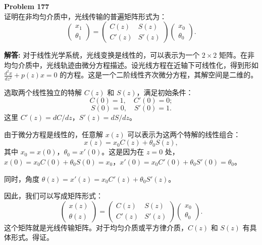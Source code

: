 \documentclass[12pt, a4paper, oneside]{ctexart}
\newenvironment{solution}{\par\noindent\textbf{解答:}\quad}{\par}
\begin{document}
\begin{mdframed}[backgroundcolor=gray!10, linewidth=0pt]
    \textbf{Problem 177} \\
    证明在非均匀介质中，光线传输的普遍矩阵形式为：
    \[
    \begin{pmatrix} x_1 \\ \theta_1 \end{pmatrix} = \begin{pmatrix} C(z) & S(z) \\ C'(z) & S'(z) \end{pmatrix} \begin{pmatrix} x_0 \\ \theta_0 \end{pmatrix}.
    \]
\end{mdframed}
\begin{solution}
    对于线性光学系统，光线变换是线性的，可以表示为一个 $2\times 2$ 矩阵。在非均匀介质中，光线轨迹由微分方程描述。设光线方程在近轴下可线性化，得到形如 $\frac{d^2 x}{dz^2} + p(z) x = 0$ 的方程。这是一个二阶线性齐次微分方程，其解空间是二维的。

    选取两个线性独立的特解 $C(z)$ 和 $S(z)$，满足初始条件：
    \[
    C(0) = 1, \quad C'(0) = 0;
    \]
    \[
    S(0) = 0, \quad S'(0) = 1.
    \]
    这里 $C'(z) = dC/dz$，$S'(z) = dS/dz$。

    由于微分方程是线性的，任意解 $x(z)$ 可以表示为这两个特解的线性组合：
    \[
    x(z) = x_0 C(z) + \theta_0 S(z),
    \]
    其中 $x_0 = x(0)$，$\theta_0 = x'(0)$。这是因为在 $z=0$ 处，$x(0) = x_0 C(0) + \theta_0 S(0) = x_0$，$x'(0) = x_0 C'(0) + \theta_0 S'(0) = \theta_0$。

    同时，角度 $\theta(z) = x'(z) = x_0 C'(z) + \theta_0 S'(z)$。

    因此，我们可以写成矩阵形式：
    \[
    \begin{pmatrix} x(z) \\ \theta(z) \end{pmatrix} = \begin{pmatrix} C(z) & S(z) \\ C'(z) & S'(z) \end{pmatrix} \begin{pmatrix} x_0 \\ \theta_0 \end{pmatrix}.
    \]
    这个矩阵就是光线传输矩阵。对于均匀介质或平方律介质，$C(z)$ 和 $S(z)$ 有具体形式。得证。
\end{solution}
\end{document}
